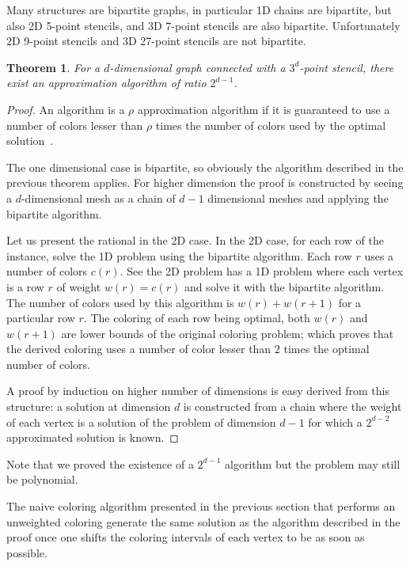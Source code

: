 \documentclass{article}
\newtheorem{theorem}{Theorem}[section]
\begin{document}
Many structures are bipartite graphs, in particular 1D chains are
bipartite, but also 2D 5-point stencils, and 3D 7-point stencils are
also bipartite. Unfortunately 2D 9-point stencils and 3D 27-point
stencils are not bipartite.

\begin{theorem}
  For a $d$-dimensional graph connected with a $3^d$-point stencil,
  there exist an approximation algorithm of ratio $2^{d-1}$.
\end{theorem}

\begin{proof}
  An algorithm is a $\rho$ approximation algorithm if it is guaranteed
  to use a number of colors lesser than $\rho$ times the number of
  colors used by the optimal solution~\cite{ApproxAlg}.
  
  The one dimensional case is bipartite, so obviously the algorithm
  described in the previous theorem applies. For higher dimension the
  proof is constructed by seeing a $d$-dimensional mesh as a chain of
  $d-1$ dimensional meshes and applying the bipartite algorithm.

  Let us present the rational in the 2D case. In the 2D case, for each
  row of the instance, solve the 1D problem using the bipartite
  algorithm. Each row $r$ uses a number of colors $c(r)$. See the 2D
  problem has a 1D problem where each vertex is a row $r$ of weight
  $w(r) = c(r)$ and solve it with the bipartite algorithm. The number
  of colors used by this algorithm is $w(r) + w(r+1)$ for a particular
  row $r$. The coloring of each row being optimal, both $w(r)$ and
  $w(r+1)$ are lower bounds of the original coloring problem; which
  proves that the derived coloring uses a number of color lesser than
  $2$ times the optimal number of colors.
  
  A proof by induction on higher number of dimensions is easy derived
  from this structure: a solution at dimension $d$ is constructed from
  a chain where the weight of each vertex is a solution of the problem
  of dimension $d-1$ for which a $2^{d-2}$ approximated solution is
  known.
\end{proof}

Note that we proved the existence of a $2^{d-1}$ algorithm but the
problem may still be polynomial.

The naive coloring algorithm presented in the previous section that
performs an unweighted coloring generate the same solution as the
algorithm described in the proof once one shifts the coloring
intervals of each vertex to be as soon as possible.
\end{document}
